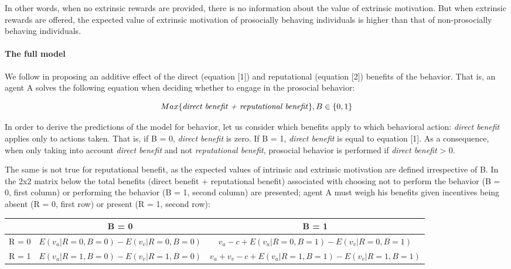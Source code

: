 \documentclass[AER]{AEA}
\begin{document}
In other words, when no extrinsic rewards are provided, there is no information about the value of extrinsic motivation. But when extrinsic rewards are offered, the expected value of extrinsic motivation of prosocially behaving individuals is higher than that of non-prosocially behaving individuals.

\paragraph{The full model}

We follow \cite{benabou_incentives_2006} in proposing an additive effect of the direct (equation [1]) and reputational (equation [2]) benefits of the behavior. That is, an agent A solves the following equation when deciding whether to engage in the prosocial behavior: 

$$Max		\{ \mbox{\textit{direct benefit + reputational benefit}} \}, B \in \{0,1\}$$

In order to derive the predictions of the model for behavior, let us consider which benefits apply to which behavioral action: \textit{direct benefit} applies only to actions taken. That is, if B = 0, \textit{direct benefit} is zero. If B = 1, \textit{direct benefit} is equal to equation [1]. As a consequence, when only taking into account \textit{direct benefit} and not \textit{reputational benefit}, prosocial behavior is performed if \textit{direct benefit} > 0.

The same is not true for reputational benefit, as the expected values of intrinsic and extrinsic motivation are defined irrespective of B. In the 2x2 matrix below the total benefits (direct benefit + reputational benefit) associated with choosing not to perform the behavior (B = 0, first column) or performing the behavior (B = 1, second column) are presented; agent A must weigh his benefits given incentives being absent (R = 0, first row) or present (R = 1, second row):


\begin{tabular}{c|c|c}
& B = 0 & B = 1 \\
\hline
R = 0 & $E(v_{a} | R = 0, B = 0) - E(v_{v} | R = 0, B = 0)$ & $v_{a} - c +
E(v_{a} | R = 0, B = 1) - E(v_{v} | R = 0, B = 1)$\\
\hline
R = 1 & $E(v_{a} | R = 1, B = 0) - E(v_{v} | R = 1, B = 0)$ & $v_{a} + v_{v} - c +
E(v_{a} | R = 1, B = 1) - E(v_{v} | R = 1, B = 1)$ \\
\end{tabular}
\end{document}
